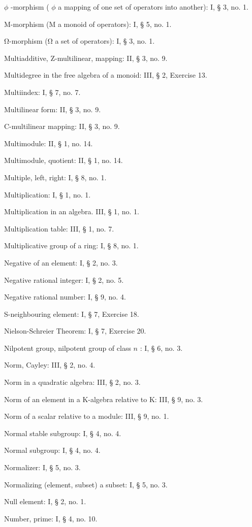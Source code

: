 \(\phi\) -morphism ( \(\phi\) a mapping of one set of operators into another): I, § 3, no. 1.

M-morphism (M a monoid of operators): I, § 5, no. 1.

Ω-morphism (Ω a set of operators): I, § 3, no. 1.

Multiadditive, Z-multilinear, mapping: II, § 3, no. 9.

Multidegree in the free algebra of a monoid: III, § 2, Exercise 13.

Multiindex: I, § 7, no. 7.

Multilinear form: II, § 3, no. 9.

C-multilinear mapping: II, § 3, no. 9.

Multimodule: II, § 1, no. 14.

Multimodule, quotient: II, § 1, no. 14.

Multiple, left, right: I, § 8, no. 1.

Multiplication: I, § 1, no. 1.

Multiplication in an algebra. III, § 1, no. 1.

Multiplication table: III, § 1, no. 7.

Multiplicative group of a ring: I, § 8, no. 1.

Negative of an element: I, § 2, no. 3.

Negative rational integer: I, § 2, no. 5.

Negative rational number: I, § 9, no. 4.

S-neighbouring element: I, § 7, Exercise 18.

Nielson-Schreier Theorem: I, § 7, Exercise 20.

Nilpotent group, nilpotent group of class \(n\) : I, § 6, no. 3.

Norm, Cayley: III, § 2, no. 4.

Norm in a quadratic algebra: III, § 2, no. 3.

Norm of an element in a K-algebra relative to K: III, § 9, no. 3.

Norm of a scalar relative to a module: III, § 9, no. 1.

Normal stable subgroup: I, § 4, no. 4.

Normal subgroup: I, § 4, no. 4.

Normalizer: I, § 5, no. 3.

Normalizing (element, subset) a subset: I, § 5, no. 3.

Null element: I, § 2, no. 1.

Number, prime: I, § 4, no. 10.

